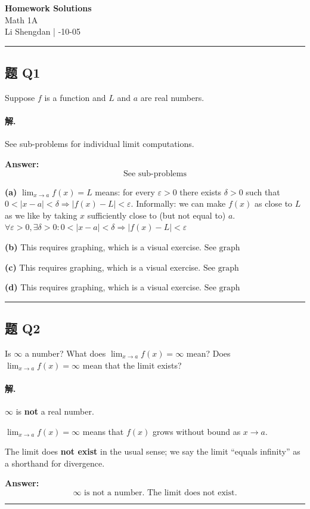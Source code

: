 \documentclass[12pt, a4paper]{article}
\newcommand{\problem}[1]{\subsection*{题 #1}}
\newcommand{\solution}{\paragraph{解.}}
\begin{document}
\begin{center}
    {\LARGE\bfseries Homework Solutions} \\[0.5em]
    {\large Math 1A} \\[0.3em]
    Li Shengdan \quad | -10-05
\end{center}

\hrule
\vspace{1em}
\problem{Q1}

Suppose $f$ is a function and $L$ and $a$ are real numbers.

\solution

See sub-problems for individual limit computations.

\textbf{Answer:}
\[\boxed{\text{See sub-problems}}\]

\textbf{(a)}
$\lim_{x \to a} f(x) = L$ means: for every $\varepsilon > 0$ there exists $\delta > 0$ such that
$0 < |x - a| < \delta \Rightarrow |f(x) - L| < \varepsilon$.
Informally: we can make $f(x)$ as close to $L$ as we like by taking $x$ sufficiently close to (but not equal to) $a$.
$\boxed{\forall \varepsilon > 0, \exists \delta > 0: 0 < |x-a| < \delta \Rightarrow |f(x)-L| < \varepsilon}$

\textbf{(b)}
This requires graphing, which is a visual exercise.
$\boxed{\text{See graph}}$

\textbf{(c)}
This requires graphing, which is a visual exercise.
$\boxed{\text{See graph}}$

\textbf{(d)}
This requires graphing, which is a visual exercise.
$\boxed{\text{See graph}}$

\vspace{1em}
\hrule
\vspace{1em}

\problem{Q2}

Is $\infty$ a number? What does $\lim_{x \to a} f(x) = \infty$ mean? Does $\lim_{x \to a} f(x) = \infty$ mean that the limit exists?

\solution

$\infty$ is \textbf{not} a real number.

$\lim_{x \to a} f(x) = \infty$ means that $f(x)$ grows without bound as $x \to a$.

The limit does \textbf{not exist} in the usual sense; we say the limit ``equals infinity'' as a shorthand for divergence.

\textbf{Answer:}
\[\boxed{\infty \text{ is not a number. The limit does not exist.}}\]

\vspace{1em}
\hrule
\vspace{1em}
\end{document}

